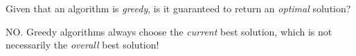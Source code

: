 Given that an algorithm is \textit{greedy}, is it guaranteed to return an \textit{optimal} solution?

\begin{answer}
NO. Greedy algorithms always choose the \textit{current} best solution,
which is not necessarily the \textit{overall} best solution!
\end{answer}
